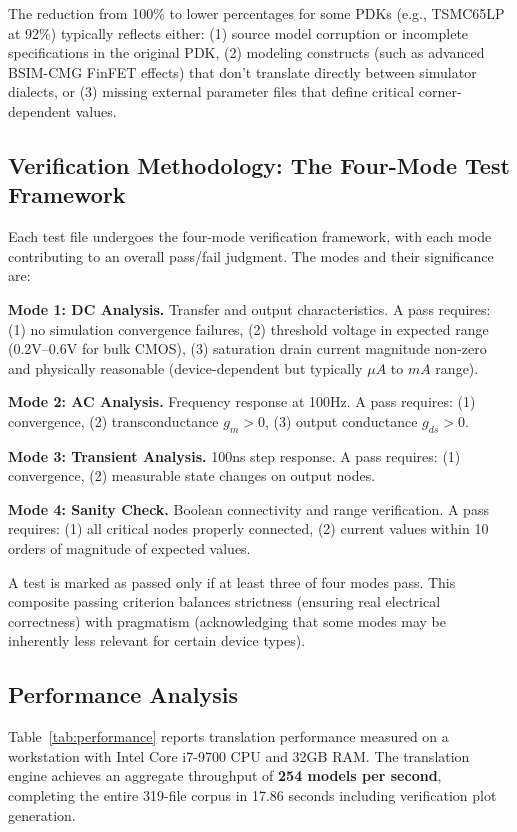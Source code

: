 \documentclass[10pt,twocolumn]{article}
\begin{document}
The reduction from 100\% to lower percentages for some PDKs (e.g., TSMC65LP at 92\%) typically reflects either: (1) source model corruption or incomplete specifications in the original PDK, (2) modeling constructs (such as advanced BSIM-CMG FinFET effects) that don't translate directly between simulator dialects, or (3) missing external parameter files that define critical corner-dependent values.

\subsection{Verification Methodology: The Four-Mode Test Framework}

Each test file undergoes the four-mode verification framework, with each mode contributing to an overall pass/fail judgment. The modes and their significance are:

\textbf{Mode 1: DC Analysis.} Transfer and output characteristics. A pass requires: (1) no simulation convergence failures, (2) threshold voltage in expected range (0.2V--0.6V for bulk CMOS), (3) saturation drain current magnitude non-zero and physically reasonable (device-dependent but typically $\mu A$ to $m A$ range).

\textbf{Mode 2: AC Analysis.} Frequency response at 100Hz. A pass requires: (1) convergence, (2) transconductance $g_m > 0$, (3) output conductance $g_{ds} > 0$.

\textbf{Mode 3: Transient Analysis.} 100ns step response. A pass requires: (1) convergence, (2) measurable state changes on output nodes.

\textbf{Mode 4: Sanity Check.} Boolean connectivity and range verification. A pass requires: (1) all critical nodes properly connected, (2) current values within 10 orders of magnitude of expected values.

A test is marked as passed only if at least three of four modes pass. This composite passing criterion balances strictness (ensuring real electrical correctness) with pragmatism (acknowledging that some modes may be inherently less relevant for certain device types).

\subsection{Performance Analysis}

Table~\ref{tab:performance} reports translation performance measured on a workstation with Intel Core i7-9700 CPU and 32GB RAM. The translation engine achieves an aggregate throughput of \textbf{254 models per second}, completing the entire 319-file corpus in 17.86 seconds including verification plot generation.
\end{document}
